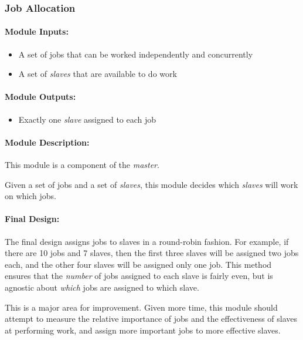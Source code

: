 \documentclass[pdftex,12pt,a4paper]{article}
\begin{document}
\subsubsection{Job Allocation}\label{sec:job-allocation}

\paragraph{Module Inputs:}
\begin{itemize}
\item A set of jobs that can be worked independently and concurrently
\item A set of \emph{slaves} that are available to do work
\end{itemize}

\paragraph{Module Outputs:}
\begin{itemize}
\item Exactly one \emph{slave} assigned to each job
\end{itemize}

\paragraph{Module Description:\\}
This module is a component of the \emph{master}.

Given a set of jobs and a set of \emph{slaves}, this module decides which \emph{slaves} will work on which jobs.

\paragraph{Final Design:\\}
The final design assigns jobs to slaves in a round-robin fashion. For example, if there are 10 jobs and 7 slaves, then the first three slaves will be assigned two jobs each, and the other four slaves will be assigned only one job. This method ensures that the \emph{number} of jobs assigned to each slave is fairly even, but is agnostic about \emph{which} jobs are assigned to which slave.

This is a major area for improvement. Given more time, this module should attempt to measure the relative importance of jobs and the effectiveness of slaves at performing work, and assign more important jobs to more effective slaves.
\end{document}
